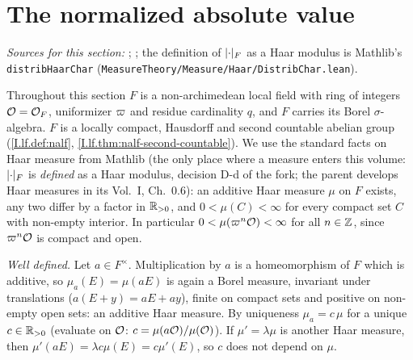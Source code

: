 \section{The normalized absolute value}\label{sec:lf-abs-haar}

\noindent\emph{Sources for this section:} \cite[§2.2]{Corv-ptIII-1}; \cite[§§1.1--1.5]{GH}; the definition of $\lvert\cdot\rvert_F$
as a Haar modulus is Mathlib's \texttt{distribHaarChar} (\texttt{MeasureTheory/\allowbreak Measure/\allowbreak Haar/\allowbreak DistribChar.lean}).

Throughout this section $F$ is a non-archimedean local field with ring of integers $\mathcal{O}=\mathcal{O}_F$, uniformizer $\varpi$
and residue cardinality $q$, and $F$ carries its Borel $\sigma$-algebra. $F$ is a locally compact, Hausdorff and second
countable abelian group (\cref{I.lf.def:nalf}, \cref{I.lf.thm:nalf-second-countable}). We use the standard facts on
Haar measure from Mathlib (the only place where a measure enters this volume: $\lvert\cdot\rvert_F$ is \emph{defined} as a
Haar modulus, decision D-d of the fork; the parent develops Haar measures in its Vol.~I, Ch.~0.6): an additive Haar measure $\mu$ on $F$ exists, any two differ by a
factor in $\mathbb{R}_{>0}$, and $0<\mu(C)<\infty$ for every compact set $C$ with non-empty interior. In particular
$0<\mu(\varpi^n\mathcal{O})<\infty$ for all $n\in\mathbb{Z}$, since $\varpi^n\mathcal{O}$ is compact and open.

\begin{definition}
\end{definition}
\noindent\emph{Well defined.} Let $a\in F^\times$. Multiplication by $a$ is a homeomorphism of $F$ which is additive,
so $\mu_a(E)=\mu(aE)$ is again a Borel measure, invariant under translations ($a(E+y)=aE+ay$), finite on compact sets and
positive on non-empty open sets: an additive Haar measure. By uniqueness $\mu_a=c\,\mu$ for a unique $c\in\mathbb{R}_{>0}$
(evaluate on $\mathcal{O}$: $c=\mu(a\mathcal{O})/\mu(\mathcal{O})$). If $\mu'=\lambda\mu$ is another Haar measure, then
$\mu'(aE)=\lambda c\mu(E)=c\mu'(E)$, so $c$ does not depend on $\mu$.

